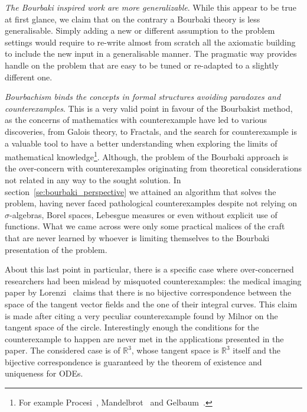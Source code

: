 \documentclass[]{scrartcl}
\theoremstyle{definition}
\begin{document}
\emph{The Bourbaki inspired work are more generalizable}. While this appear to be true at first glance, we claim that on the contrary a Bourbaki theory is less generalisable. Simply adding a new or different assumption to the problem settings would require to re-write almost from scratch all the axiomatic building to include the new input in a generalisable manner. The pragmatic way provides handle on the problem that are easy to be tuned or re-adapted to a slightly different one.

\emph{Bourbachism binds the concepts in formal structures avoiding paradoxes and counterexamples}. This is a very valid point in favour of the Bourbakist method, as the concerns of mathematics with counterexample have led to various discoveries, from Galois theory, to Fractals, and the search for counterexample is a valuable tool to have a better understanding when exploring the limits of mathematical knowledge\footnote{
    For example Procesi~\cite{procesi1977elementi}, Mandelbrot~\cite{mandelbrot1983fractal} and Gelbaum~\cite{gelbaum2003counterexamples}.
}. Although, the problem of the Bourbaki approach is the over-concern with counterexamples originating from theoretical considerations not related in any way to the sought solution. In section~\ref{se:bourbaki_perspective} we attained an algorithm that solves the problem, having never faced pathological counterexamples despite not relying on $\sigma$-algebras, Borel spaces, Lebesgue measures or even without explicit use of functions. What we came across were only some practical malices of the craft that are never learned by whoever is limiting themselves to the Bourbaki presentation of the problem.

About this last point in particular, there is a specific case where over-concerned researchers had been mislead by misquoted counterexamples: the medical imaging paper by Lorenzi~\cite{lorenzi2013geodesics} claims that there is no bijective correspondence between the space of the tangent vector fields and the one of their integral curves. This claim is made after citing a very peculiar counterexample found by Milnor on the tangent space of the circle.
Interestingly enough the conditions for the counterexample to happen are never met in the applications presented in the paper. The considered case is of $\mathbb{R}^3$, whose tangent space is $\mathbb{R}^3$ itself and the bijective correspondence is guaranteed by the theorem of existence and uniqueness for ODEs.


\end{document}
